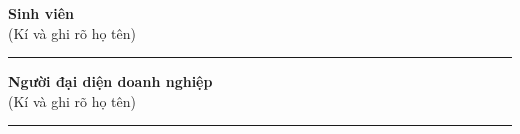 \vspace{1cm}

\begin{center}
\begin{minipage}[t]{0.4\textwidth}
    \centering
    \textbf{Sinh viên}\\[0.2cm]
    (Kí và ghi rõ họ tên)

    \vspace{2.5cm}

    \rule{0.8\linewidth}{0.4pt}
\end{minipage}
\hfill
\begin{minipage}[t]{0.4\textwidth}
    \centering
    \textbf{Người đại diện doanh nghiệp}\\[0.2cm]
    (Kí và ghi rõ họ tên)

    \vspace{2.5cm}

    \rule{0.8\linewidth}{0.4pt}
\end{minipage}
\end{center}